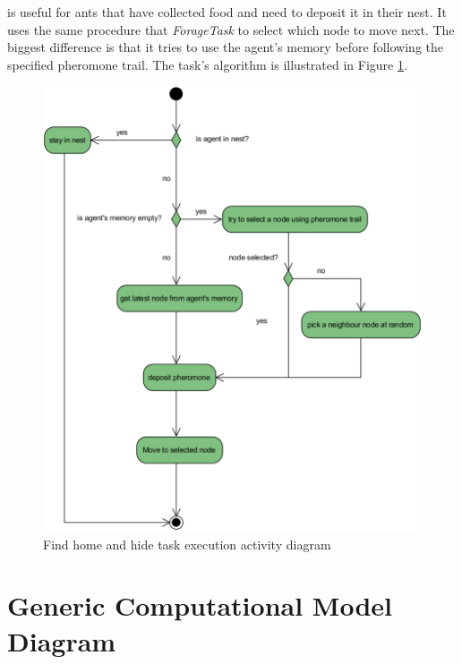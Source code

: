 is useful for ants that have collected food and need to deposit it in their nest. It uses the same procedure that \emph{ForageTask} to select which node to move next. The biggest difference is that it tries to use the agent's memory before following the specified pheromone trail. The task's algorithm is illustrated in Figure \ref{fig:find-home-hide-act}.

\begin{figure}[H]
  \centering
  \includegraphics[width=0.8\linewidth]{gfx/uml-act-home-hide.png}
  \caption{Find home and hide task execution activity diagram}
  \label{fig:find-home-hide-act}
\end{figure}

\section {Generic Computational Model Diagram}

